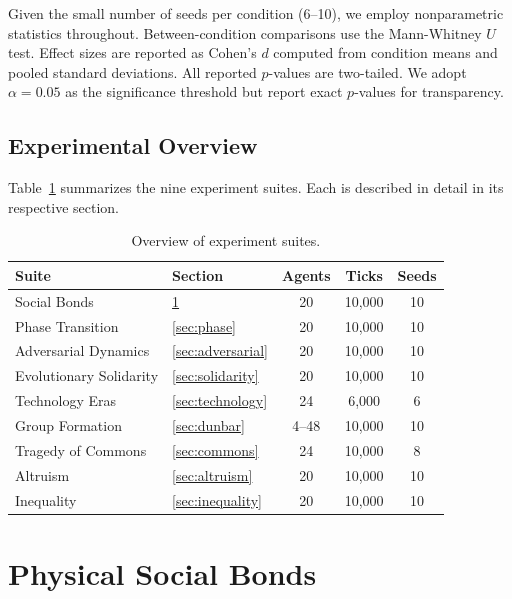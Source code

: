 \documentclass[12pt,a4paper]{article}
\begin{document}
Given the small number of seeds per condition (6--10), we employ nonparametric statistics throughout. Between-condition comparisons use the Mann-Whitney $U$ test. Effect sizes are reported as Cohen's $d$ computed from condition means and pooled standard deviations. All reported $p$-values are two-tailed. We adopt $\alpha = 0.05$ as the significance threshold but report exact $p$-values for transparency.

\subsection{Experimental Overview}

Table~\ref{tab:experiments} summarizes the nine experiment suites. Each is described in detail in its respective section.

\begin{table}[H]
\centering
\caption{Overview of experiment suites.}
\label{tab:experiments}
\small
\begin{tabular}{@{}llccc@{}}
\toprule
\textbf{Suite} & \textbf{Section} & \textbf{Agents} & \textbf{Ticks} & \textbf{Seeds} \\
\midrule
Social Bonds            & \ref{sec:bonds}       & 20 & 10{,}000 & 10 \\
Phase Transition        & \ref{sec:phase}       & 20 & 10{,}000 & 10 \\
Adversarial Dynamics    & \ref{sec:adversarial} & 20 & 10{,}000 & 10 \\
Evolutionary Solidarity & \ref{sec:solidarity}  & 20 & 10{,}000 & 10 \\
Technology Eras         & \ref{sec:technology}  & 24 & 6{,}000  & 6  \\
Group Formation         & \ref{sec:dunbar}      & 4--48 & 10{,}000 & 10 \\
Tragedy of Commons      & \ref{sec:commons}     & 24 & 10{,}000 & 8  \\
Altruism                & \ref{sec:altruism}    & 20 & 10{,}000 & 10 \\
Inequality              & \ref{sec:inequality}  & 20 & 10{,}000 & 10 \\
\bottomrule
\end{tabular}
\end{table}

\section{Physical Social Bonds}
\label{sec:bonds}
\end{document}
